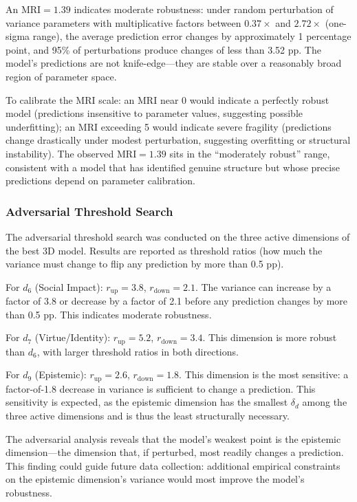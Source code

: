 \documentclass[12pt]{article}
\newcommand{\MRI}{\mathrm{MRI}}
\begin{document}
An $\MRI = 1.39$ indicates moderate robustness: under random perturbation of variance parameters with multiplicative factors between $0.37\times$ and $2.72\times$ (one-sigma range), the average prediction error changes by approximately 1 percentage point, and 95\% of perturbations produce changes of less than 3.52 pp.  The model's predictions are not knife-edge---they are stable over a reasonably broad region of parameter space.

To calibrate the MRI scale: an $\MRI$ near 0 would indicate a perfectly robust model (predictions insensitive to parameter values, suggesting possible underfitting); an $\MRI$ exceeding 5 would indicate severe fragility (predictions change drastically under modest perturbation, suggesting overfitting or structural instability).  The observed $\MRI = 1.39$ sits in the ``moderately robust'' range, consistent with a model that has identified genuine structure but whose precise predictions depend on parameter calibration.

\subsubsection{Adversarial Threshold Search}

The adversarial threshold search was conducted on the three active dimensions of the best 3D model.  Results are reported as threshold ratios (how much the variance must change to flip any prediction by more than 0.5 pp).

For $d_6$ (Social Impact): $r_{\mathrm{up}} = 3.8$, $r_{\mathrm{down}} = 2.1$.  The variance can increase by a factor of 3.8 or decrease by a factor of 2.1 before any prediction changes by more than 0.5 pp.  This indicates moderate robustness.

For $d_7$ (Virtue/Identity): $r_{\mathrm{up}} = 5.2$, $r_{\mathrm{down}} = 3.4$.  This dimension is more robust than $d_6$, with larger threshold ratios in both directions.

For $d_9$ (Epistemic): $r_{\mathrm{up}} = 2.6$, $r_{\mathrm{down}} = 1.8$.  This dimension is the most sensitive: a factor-of-1.8 decrease in variance is sufficient to change a prediction.  This sensitivity is expected, as the epistemic dimension has the smallest $\delta_d$ among the three active dimensions and is thus the least structurally necessary.

The adversarial analysis reveals that the model's weakest point is the epistemic dimension---the dimension that, if perturbed, most readily changes a prediction.  This finding could guide future data collection: additional empirical constraints on the epistemic dimension's variance would most improve the model's robustness.
\end{document}
